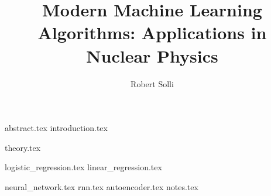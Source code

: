 \documentclass{uiofysmaster}
\author{Robert Solli}
\title{Modern Machine Learning Algorithms: Applications in Nuclear Physics}
\begin{document}
\maketitle

\tableofcontents
\listoffigures

\newpage

{abstract.tex}
{introduction.tex}

{theory.tex}

{logistic_regression.tex}
{linear_regression.tex}


{neural_network.tex}
{rnn.tex}
{autoencoder.tex}
{notes.tex}


% 


\end{document}
